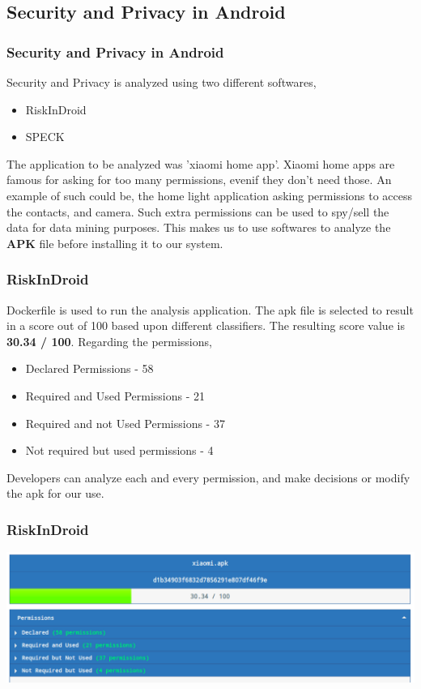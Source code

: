 \documentclass{beamer}
\begin{document}
\subsection{Security and Privacy in Android}
\begin{frame}
    \frametitle{Security and Privacy in Android}
    Security and Privacy is analyzed using two different softwares,
    \begin{itemize}
        \item RiskInDroid
        \item SPECK
    \end{itemize}
The application to be analyzed was 'xiaomi home app'. Xiaomi home apps are famous for asking for too many permissions, evenif they don't need those.
An example of such could be, the home light application asking permissions to access the contacts, and camera. Such extra permissions can be used to spy/sell the data
for data mining purposes. This makes us to use softwares to analyze the \textbf{APK} file before 
installing it to our system.
\end{frame}

\begin{frame}
    \frametitle{RiskInDroid}
    Dockerfile is used to run the analysis application. The apk file is selected to result in a score out of 100
    based upon different classifiers. The resulting score value is \textbf{30.34 / 100}.
    Regarding the permissions, 
    \begin{itemize}
        \item Declared Permissions - 58
        \item Required and Used Permissions - 21
        \item Required and not Used Permissions - 37
        \item Not required but used permissions - 4
    \end{itemize}

    Developers can analyze each and every permission, and make decisions or modify the apk for our use.
\end{frame}

\begin{frame}
    \frametitle{RiskInDroid}
    \includegraphics[width=\textwidth]{images/xiaomi-riskinDroid.png}
\end{frame}
\end{document}
